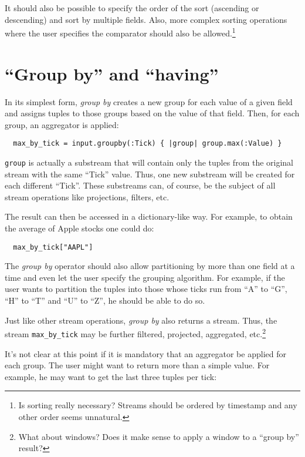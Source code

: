 \documentclass[twoside]{report}
\begin{document}
It should also be possible to specify the order of the sort (ascending or descending) and sort by multiple fields. Also, more complex sorting operations where the user specifies the comparator should also be allowed.\footnote{Is sorting really necessary? Streams should be ordered by timestamp and any other order seems unnatural.}

\section{``Group by'' and ``having''}

In its simplest form, \emph{group by} creates a new group for each value of a given field and assigns tuples to those groups based on the value of that field. Then, for each group, an aggregator is applied:

\begin{verbatim}
  max_by_tick = input.groupby(:Tick) { |group| group.max(:Value) }
\end{verbatim}

\verb=group= is actually a substream that will contain only the tuples from the original stream with the same ``Tick'' value. Thus, one new substream will be created for each different ``Tick''. These substreams can, of course, be the subject of all stream operations like projections, filters, etc.

The result can then be accessed in a dictionary-like way. For example, to obtain the average of Apple stocks one could do:

\begin{verbatim}
  max_by_tick["AAPL"]
\end{verbatim}

The \emph{group by} operator should also allow partitioning by more than one field at a time and even let the user specify the grouping algorithm. For example, if the user wants to partition the tuples into those whose ticks run from ``A'' to ``G'', ``H'' to ``T'' and ``U'' to ``Z'', he should be able to do so.

Just like other stream operations, \emph{group by} also returns a stream. Thus, the stream \verb=max_by_tick= may be further filtered, projected, aggregated, etc.\footnote{What about windows? Does it make sense to apply a window to a ``group by'' result?}

It's not clear at this point if it is mandatory that an aggregator be applied for each group. The user might want to return more than a simple value. For example, he may want to get the last three tuples per tick:
\end{document}
